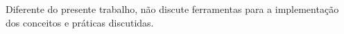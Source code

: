 Diferente do presente trabalho,  não discute ferramentas para a implementação dos conceitos e práticas discutidas.








